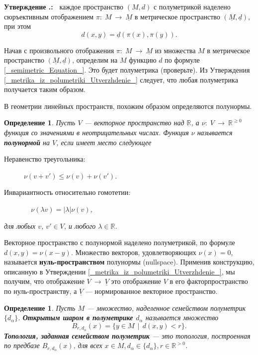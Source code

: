 \documentclass[12pt]{book}
\newcommand{\arrow}{{\:\longrightarrow\:}}
\def\endproof{\hbox{\vrule width 5pt height 5pt depth 0pt}}
\def\R{{\mathbb R}}
\theoremstyle{upshape}
\theoremstyle{generic}
\newtheorem{opredelenie}[teorema]{Определение}
\def\еза{\end{remark}}
\theoremstyle{upshapenonumber}
\newtheorem{ukazanie}{Указание}[section]
\newcommand{\следствие}{%
     \refstepcounter{teorema}
     {\noindent\bf Следствие \thechapter.\arabic{teorema}:\ }}
\newcommand{\пример}{%
     \refstepcounter{teorema}
     {\noindent\bf Пример \thechapter.\arabic{teorema}:\ }}
\newcommand{\лемма}{%
     \refstepcounter{teorema}
     {\noindent\bf Лемма \thechapter.\arabic{teorema}:\ }}
\newcommand{\теорема}{%
     \refstepcounter{teorema}
     {\noindent\bf Теорема \thechapter.\arabic{teorema}:\ }}
\newcommand{\утверждение}{%
     \refstepcounter{teorema}
     {\noindent\bf Утверждение \thechapter.\arabic{teorema}:\ }}
\def\хфилл{\hfill}
\def\бф{\bf}
\def\ем{\em}
\def\ез{\end{zadacha}}
\def\указание{\begin{ukazanie}}
\def\еу{\end{ukazanie}}
\def\определение{\begin{opredelenie}}
\def\ео{\end{opredelenie}}
\def\енум{\begin{enumerate}}
\def\ее{\end{enumerate}}
\begin{document}
\хфилл

\утверждение\label{_metrika_iz_polumetriki_Utverzhdenie_}
каждое пространство $(M,d)$ с полуметрикой наделено сюръективным
отображением $\pi:\; M \arrow \underline M$
в метрическое пространство $(\underline M, \underline d)$,
при этом 
\begin{equation}\label{_semimetric_Equation_}
d(x,y) = \underline d(\pi(x), \pi(y)).
\end{equation}
\endproof

\hfill

Начав с произвольного отображения 
$\pi:\; M \arrow \underline M$ из множества $M$ 
в метрическое пространство $(\underline M, \underline d)$,
определим на $M$ функцию $d$ по формуле
\eqref{_semimetric_Equation_}. Это будет полуметрика
(проверьте). Из Утверждения
\ref{_metrika_iz_polumetriki_Utverzhdenie_}
следует, что любая полуметрика получается таким образом.

В геометрии линейных пространств,
похожим образом определяются полунормы.


\определение
Пусть $V$ --- векторное пространство над $\R$, а 
$\nu:\; V \arrow \R^{\geq 0}$ функция со значениями
в неотрицательных числах. Функция $\nu$ называется {\бф полунормой} на
$V$, если имеет место следующее 
\begin{description}
\item[Неравенство треугольника:] $\nu (v+v') \leq \nu(v) + \nu(v')$.
\item[Инвариантность относительно гомотетии:] \ \ 
$\nu(\lambda v) = |\lambda| \nu(v)$,
\end{description}
для любых $v$, $v'\in V$, и  любого $\lambda\in \R$.
\ео

Векторное пространство с полунормой наделено полуметрикой,
по формуле $d(x,y) = \nu(x-y)$. Множество векторов,
удовлетворяющих $\nu(x)=0$, называется {\бф
нуль-пространством} полунормы (nullspace).
Применив конструкцию, описанную в Утверждении
\ref{_metrika_iz_polumetriki_Utverzhdenie_},
мы получим, что отображение $V\arrow \underline V$
это отображение $V$ в его факторпространство по
нуль-пространству, а $\underline V$ --- нормированное
векторное пространство.


\определение
Пусть $M$ --- множество, наделенное семейством
полуметрик $\{d_\alpha\}$. {\бф Открытым шаром в полуметрике $d_\alpha$}
называется множество
\[ 
  B_{r,d_\alpha}(x) = \{ y\in M \ \ | \ \ d(x,y) < r\}.
\]
{\бф Топология, заданная семейством полуметрик} --- это
топология, построенная по предбазе $B_{r,d_\alpha}(x)$,
для всех $x\in M, d_\alpha \in \{d_\alpha\}, r\in \R^{>0}$.
\ео
\end{document}
